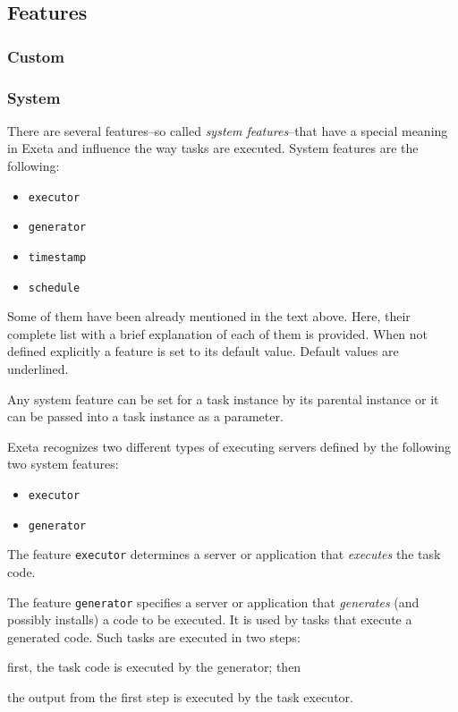 \documentclass[a4paper,12pt,english,oneside]{book}
\newcommand{\exeta}{Exeta\xspace}
\begin{document}

\subsection{Features}\label{sec:fea}

\subsubsection{Custom}

\subsubsection{System}

There are several features--so called \emph{system features}--that have a special meaning in \exeta and influence the way tasks are executed. System features are the following:
\begin{itemize}
\item \verb|executor|
\item \verb|generator|
\item \verb|timestamp|
\item \verb|schedule|
\end{itemize}
Some of them have been already mentioned in the text above. Here, their complete list with a brief explanation of each of them is provided. When not defined explicitly a feature is set to its default value. Default values are underlined.

Any system feature can be set for a task instance by its parental instance or it can be passed into a task instance as a parameter.

\exeta recognizes two different types of executing servers defined by the following two system features:
\begin{itemize}
\item \verb|executor|
\item \verb|generator|
\end{itemize}

The feature \verb|executor| determines a server or application that \emph{executes} the task code.

The feature \verb|generator| specifies a server or application that \emph{generates} (and possibly installs) a code to be executed. It is used by tasks that execute a generated code. Such tasks are executed in two steps:%
\begin{inparaenum}[(i)]
\item first, the task code is executed by the generator; then
\item the output from the first step is executed by the task executor.
\end{inparaenum}
\end{document}
